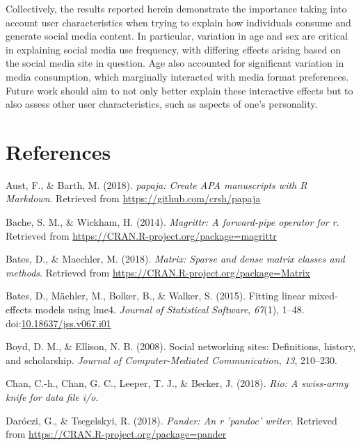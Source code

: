 \documentclass[man, fleqn, noextraspace]{apa6}
\theoremstyle{definition}
\theoremstyle{definition}
\theoremstyle{definition}
\theoremstyle{remark}
\begin{document}
Collectively, the results reported herein demonstrate the importance
taking into account user characteristics when trying to explain how
individuals consume and generate social media content. In particular,
variation in age and sex are critical in explaining social media use
frequency, with differing effects arising based on the social media site
in question. Age also accounted for significant variation in media
consumption, which marginally interacted with media format preferences.
Future work should aim to not only better explain these interactive
effects but to also assess other user characteristics, such as aspects
of one's personality.

\newpage

\section{References}\label{references}

\begingroup
\setlength{\parindent}{-0.5in} \setlength{\leftskip}{0.5in}

\hypertarget{refs}{}
\hypertarget{ref-R-papaja}{}
Aust, F., \& Barth, M. (2018). \emph{papaja: Create APA manuscripts with
R Markdown}. Retrieved from \url{https://github.com/crsh/papaja}

\hypertarget{ref-R-magrittr}{}
Bache, S. M., \& Wickham, H. (2014). \emph{Magrittr: A forward-pipe
operator for r}. Retrieved from
\url{https://CRAN.R-project.org/package=magrittr}

\hypertarget{ref-R-Matrix}{}
Bates, D., \& Maechler, M. (2018). \emph{Matrix: Sparse and dense matrix
classes and methods}. Retrieved from
\url{https://CRAN.R-project.org/package=Matrix}

\hypertarget{ref-R-lme4}{}
Bates, D., Mächler, M., Bolker, B., \& Walker, S. (2015). Fitting linear
mixed-effects models using lme4. \emph{Journal of Statistical Software},
\emph{67}(1), 1--48.
doi:\href{https://doi.org/10.18637/jss.v067.i01}{10.18637/jss.v067.i01}

\hypertarget{ref-Boyd2008}{}
Boyd, D. M., \& Ellison, N. B. (2008). Social networking sites:
Definitions, history, and scholarship. \emph{Journal of
Computer-Mediated Communication}, \emph{13}, 210--230.

\hypertarget{ref-R-rio}{}
Chan, C.-h., Chan, G. C., Leeper, T. J., \& Becker, J. (2018).
\emph{Rio: A swiss-army knife for data file i/o}.

\hypertarget{ref-R-pander}{}
Daróczi, G., \& Tsegelskyi, R. (2018). \emph{Pander: An r 'pandoc'
writer}. Retrieved from \url{https://CRAN.R-project.org/package=pander}
\end{document}
